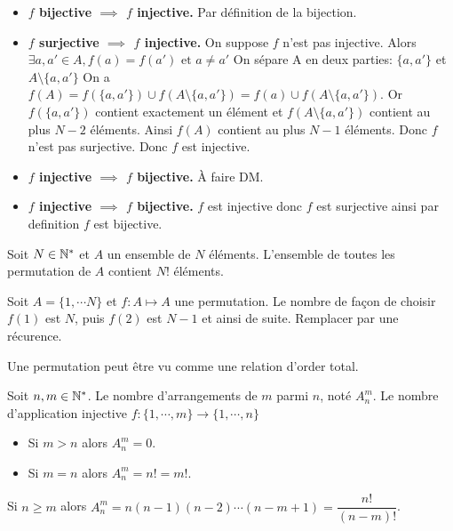 \documentclass[a4paper, 12pt]{article}
\begin{document}
\begin{demonstration}
    \begin{itemize}
        \item \textbf{$f$ bijective $\implies$ $f$ injective.} Par définition de la bijection.
        \item \textbf{$f$ surjective $\implies$ $f$ injective.} On suppose $f$ n'est pas injective.
        Alors $\exists a, a' \in A, f(a) = f(a') \text{ et } a \neq a'$
        On sépare A en deux parties: $\{a, a'\}$ et $A \setminus \{a, a'\}$
        On a $f(A) = f(\{a, a'\}) \cup f(A \setminus \{a, a'\}) = f(a) \cup f(A \setminus \{a, a'\})$.
        Or $f(\{a, a'\})$ contient exactement un élément et $f(A \setminus \{a, a'\})$ contient au plus $N - 2$ éléments.
        Ainsi $f(A)$ contient au plus $N - 1$ éléments. Donc $f$ n'est pas surjective.
        Donc $f$ est injective.
        \item \textbf{$f$ injective $\implies$ $f$ bijective.} \color{red}À faire DM.\color{black} 
        \item \textbf{$f$ injective $\implies$ $f$ bijective.} $f$ est injective donc $f$ est surjective ainsi par definition $f$ est bijective.
    \end{itemize}
\end{demonstration}

\begin{proposition}
    Soit $N \in \mathbb{N}^*$ et $A$ un ensemble de $N$ éléments.
    L'ensemble de toutes les permutation de $A$ contient $N!$ éléments.
\end{proposition}

\begin{demonstration}
    Soit $A = \{1, \cdots N\}$ et $f: A \mapsto A$ une permutation.
    Le nombre de façon de choisir $f(1)$ est $N$, puis $f(2)$ est $N - 1$ et ainsi de suite. \color{red}Remplacer par une récurence.\color{black}
\end{demonstration}

\begin{remark}
    Une permutation peut être vu comme une relation d'order total.
\end{remark}

\begin{definition}
    Soit $n, m \in \mathbb{N}^*$. Le nombre d'arrangements de $m$ parmi $n$, noté $A^m_n$.
    Le nombre d'application injective $f: \{1, \cdots, m\} \to \{1, \cdots, n\}$
\end{definition}

\begin{proposition}
    \begin{itemize}
        \item Si $m \gt n$ alors $A^m_n = 0$.
        \item Si $m = n$ alors $A^m_n = n! = m!$.
    \end{itemize}
\end{proposition}

\begin{proposition}
    Si $n \geq m$ alors $A^m_n = n(n-1)(n-2)\cdots(n-m+1) = \dfrac{n!}{(n - m)!}$.
\end{proposition}
\end{document}
